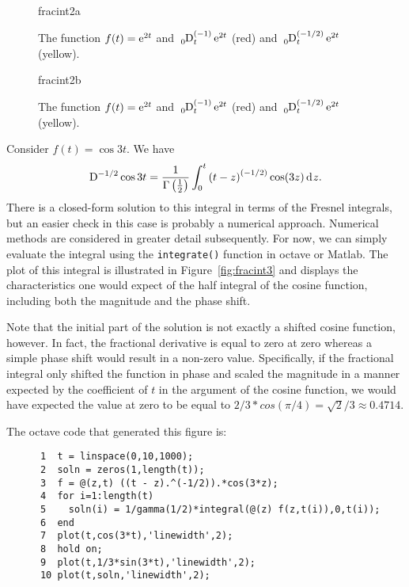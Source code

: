     \begin{figure}
      \centering
      {fracint2a}
      \caption{The function $f(t) = \operatorname{e}^{2 t}$ and $\tensor*[_0]{\D}{^{(-1)}_t} \e^{2t}$ (red) and $\tensor*[_0]{\D}{^{(-1/2)}_t} \e^{2t}$ (yellow).}
      \label{fig:fracint2a}
    \end{figure}

    \begin{figure}
      \centering
      {fracint2b}
      \caption{The function $f(t) = \operatorname{e}^{2 t}$ and $\tensor*[_0]{\D}{^{(-1)}_t} \e^{2t}$ (red) and $\tensor*[_0]{\D}{^{(-1/2)}_t} \e^{2t}$ (yellow).}
      \label{fig:fracint2b}
    \end{figure}

    \begin{example}
      Consider $f(t) = \cos 3 t$. We have
      \begin{equation*}
	\tensor*[]{\D}{^{-1/2}} \cos 3 t = \frac{1}{\Gamma \left( \frac{1}{2} \right) } \int_0^t \left( t - z \right)^{\left( -1/2 \right)} \cos(3z) \d{z}.
      \end{equation*}
      There is a closed-form solution to this integral in terms of the Fresnel integrals, but an easier check in this case is probably a numerical approach. Numerical methods are considered in greater detail subsequently. For now, we can simply evaluate the integral using the \texttt{integrate()} function in octave or Matlab. The plot of this integral is illustrated in Figure~\ref{fig:fracint3} and displays the characteristics one would expect of the half integral of the cosine function, including both the magnitude and the phase shift.  

      Note that the initial part of the solution is not exactly a shifted cosine function, however. In fact, the fractional derivative is equal to zero at zero whereas a simple phase shift would result in a non-zero value. Specifically, if the fractional integral only shifted the function in phase and scaled the magnitude in a manner expected by the coefficient of $t$ in the argument of the cosine function, we would have expected the value at zero to be equal to $2/3*cos(\pi/4) = \sqrt{2}/3 \approx 0.4714$. 

      The octave code that generated this figure is:
      \begin{verbatim}
      1  t = linspace(0,10,1000);
      2  soln = zeros(1,length(t));
      3  f = @(z,t) ((t - z).^(-1/2)).*cos(3*z);
      4  for i=1:length(t)
      5    soln(i) = 1/gamma(1/2)*integral(@(z) f(z,t(i)),0,t(i));
      6  end
      7  plot(t,cos(3*t),'linewidth',2);
      8  hold on;
      9  plot(t,1/3*sin(3*t),'linewidth',2);
      10 plot(t,soln,'linewidth',2);
      \end{verbatim}
    \end{example}


